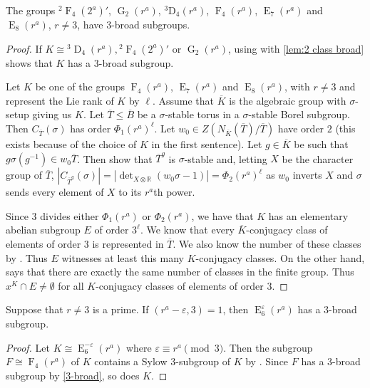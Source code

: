 \documentclass[12pt,a4paper]{amsart}
\DeclareMathOperator{\D}{D}
\DeclareMathOperator{\E}{E}
\DeclareMathOperator{\F}{F}
\DeclareMathOperator{\G}{G}
\renewcommand{\epsilon}{\varepsilon}
\newcommand{\ov}{\overline}
\newcommand{\eps}{\epsilon}
\begin{document}
\begin{lemma}\label{3-broad} The groups ${}^2\F_4(2^a)'$, $\G_2(r^a)$, ${}^3\mathrm{D_4}(r^a)$, $\F_4(r^a)$, $\E_7(r^a)$ and $\E_8(r^a)$, $r \ne 3$, have $3$-broad subgroups.
\end{lemma}
\begin{proof}
If $K\cong {}^3\D_4(r^a), {}^2\F_4(2^a)'$ or $\G_2(r^a)$, using
\cite[Table 4.7.3A]{GLS3} with \cref{lem:2 class broad} shows that $K$ has a $3$-broad subgroup.



Let $K$ be one of the   groups  $\F_4(r^a)$, $\E_7(r^a)$ and $\E_8(r^a)$, with $r \ne 3$ and represent the Lie rank of $K$ by $\ell$. Assume that $\ov K$ is the algebraic group with $\sigma$-setup giving us $K$. Let $\ov T\le \ov B$ be a $\sigma$-stable torus in a $\sigma$-stable Borel subgroup.  Then $C_{\ov T}(\sigma)$ has order $\Phi_1(r^a)^\ell$.  Let $w_0 \in Z(N_{\ov K}(\ov T)/\ov T)$ have order $2$ (this exists because of the choice of $K$
in the first sentence). Let $g\in \ov K$ be such that $g\sigma(g^{-1}) \in w_0\ov T$. Then \cite[Propositions 25.1 and 25.3]{MalleTesterman} show that $ \ov T^g$ is $\sigma$-stable
and, letting $X$ be the character group of $\ov T$, $|C_{\ov T^g}(\sigma)|= |\det_{X\otimes \mathbb R}(w_0\sigma-1)|=\Phi_2(r^a)^\ell$ as $w_0$ inverts $X$ and $\sigma$ sends every element of $X$ to its $r^a$th power.

Since $3$ divides either $\Phi_1(r^a)$ or $\Phi_2(r^a)$, we have that $K$ has an elementary abelian subgroup $E$ of order $3^\ell$. We know that every $\ov K$-conjugacy class of elements of order $3$ is represented in $\ov T$. We also know the number of these classes by \cite[Table 4.7.1]{GLS3}. Thus $E$ witnesses at least this many $K$-conjugacy classes. On the other hand, \cite[Table 4.7.3A]{GLS3} says that there are exactly the same number of classes in the finite group. Thus $x^K \cap E \not=\emptyset$ for all $K$-conjugacy classes of elements of order $3$.
\end{proof}


\begin{lemma}\label{lem:E6 good cases} Suppose that $r\ne 3$ is a prime.
   If $(r^a-\eps,3)=1$, then $\E_6^\eps(r^a)$ has a $3$-broad  subgroup.
\end{lemma}

\begin{proof} Let $K\cong \E_6^{-\eps}(r^a)$ where $\eps\equiv r^a \pmod 3$. Then the subgroup $F\cong \F_4(r^a)$ of $K$ contains a Sylow $3$-subgroup of $K$ by \cite[Table 2.2]{GLS3}. Since $F$ has a $3$-broad subgroup by \cref{3-broad}, so does $K$.
\end{proof}
\end{document}
